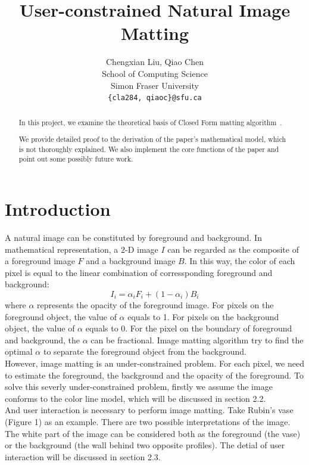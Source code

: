 \documentclass[11pt,letterpaper]{article}
\title{User-constrained Natural Image Matting}
\author{Chengxian Liu, Qiao Chen\\
  School of Computing Science \\ Simon Fraser University \\
  {\tt \{cla284, qiaoc\}@sfu.ca}  
}
\begin{document}
\maketitle
\begin{abstract}
In this project, we examine the theoretical basis of Closed Form matting algorithm~\cite{Levin:2006}.

We provide detailed proof to the derivation of the paper's mathematical model, which is not thoroughly explained. We also implement the core functions of the paper and point out some possibly future work.
\end{abstract}

\section{Introduction}
A natural image can be constituted by foreground and background. In mathematical representation, a 2-D image $I$ can be regarded as the composite of a foreground image $F$ and a background image $B$. In this way, the color of each pixel is equal to the linear combination of corressponding foreground and background:\\
\begin{equation}
  I_{i} = \alpha_{i}F_{i} + (1-\alpha_{i})B_{i}
\end{equation}
where $\alpha$ represents the opacity of the foreground image. For pixels on the foreground object, the value of $\alpha$ equals to 1. For pixels on the background object, the value of $\alpha$ equals to 0. For the pixel on the boundary of foreground and background, the $\alpha$ can be fractional. Image matting algorithm try to find the optimal $\alpha$ to separate the foreground object from the background. \\

However, image matting is an under-constrained problem. For each pixel, we need to estimate the foreground, the background and the opacity of the foreground. To solve this severly under-constrained problem, firstly we assume the image conforms to the color line model, which will be discussed in section 2.2. \\

And user interaction is necessary to perform image matting. Take Rubin’s vase (Figure 1) as an example. There are two possible interpretations of the image. The white part of the image can be considered both as the foreground (the vase) or the background (the wall behind two opposite profiles). The detial of user interaction will be discussed in section 2.3. \\
\end{document}
